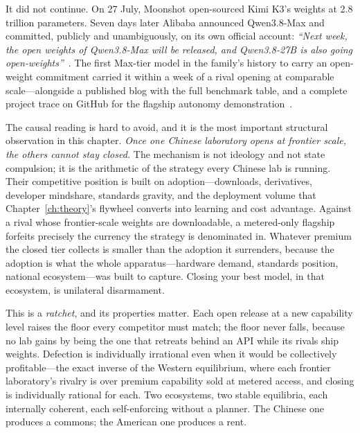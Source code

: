 It did not continue. On 27 July, Moonshot open-sourced Kimi K3's weights at 2.8 trillion parameters. Seven days later Alibaba announced Qwen3.8-Max and committed, publicly and unambiguously, on its own official account: \emph{``Next week, the open weights of Qwen3.8-Max will be released, and Qwen3.8-27B is also going open-weights''}~\cite{qwen-announcement}. The first Max-tier model in the family's history to carry an open-weight commitment carried it within a week of a rival opening at comparable scale---alongside a published blog with the full benchmark table, and a complete project trace on GitHub for the flagship autonomy demonstration~\cite{qwen38-blog}.

The causal reading is hard to avoid, and it is the most important structural observation in this chapter. \emph{Once one Chinese laboratory opens at frontier scale, the others cannot stay closed.} The mechanism is not ideology and not state compulsion; it is the arithmetic of the strategy every Chinese lab is running. Their competitive position is built on adoption---downloads, derivatives, developer mindshare, standards gravity, and the deployment volume that Chapter~\ref{ch:theory}'s flywheel converts into learning and cost advantage. Against a rival whose frontier-scale weights are downloadable, a metered-only flagship forfeits precisely the currency the strategy is denominated in. Whatever premium the closed tier collects is smaller than the adoption it surrenders, because the adoption is what the whole apparatus---hardware demand, standards position, national ecosystem---was built to capture. Closing your best model, in that ecosystem, is unilateral disarmament.

This is a \emph{ratchet}, and its properties matter. Each open release at a new capability level raises the floor every competitor must match; the floor never falls, because no lab gains by being the one that retreats behind an API while its rivals ship weights. Defection is individually irrational even when it would be collectively profitable---the exact inverse of the Western equilibrium, where each frontier laboratory's rivalry is over premium capability sold at metered access, and closing is individually rational for each. Two ecosystems, two stable equilibria, each internally coherent, each self-enforcing without a planner. The Chinese one produces a commons; the American one produces a rent.

